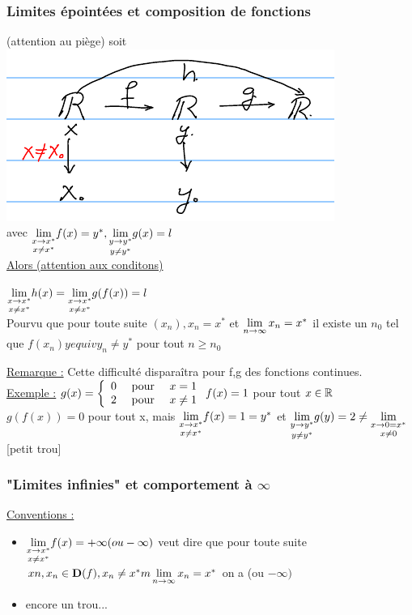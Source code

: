 \documentclass[12pt,a4paper]{article}
\begin{document}
{\subsubsection{Limites épointées et composition de fonctions}
(attention au piège)
soit \includegraphics[scale=0.5]{illustrations_Analyse/compo}\\
avec $\underset{x \neq x^*}{\lim\limits_{x \to x^*}} f(x )= y^*, \underset{y \neq y^*}{\lim\limits_{y \to y^*}} g(x) = l$\\
\underline{Alors (attention aux conditons)}
\begin{boite}
$\underset{x \neq x^*}{\lim\limits_{x \to x^*}} h(x) = \underset{x \neq x^*}{\lim\limits_{x \to x^*}} g(f(x)) = l$\\
Pourvu que pour toute suite $(x_n), x_n = x^*$ et $\lim\limits_{n \to \infty} x_n = x^*$ il existe un $n_0$ tel que $f(x_n) yequiv y_n \neq y^*$ pour tout $n \geq n_0$
\end{boite}
\underline{Remarque :} Cette difficulté disparaîtra pour f,g des fonctions continues.\\
\underline{Exemple :} $g(x) =
\left\{
\begin{array}{lll}
0 & \mbox{ pour } & x = 1\\
2 & \mbox{ pour } & x \neq 1
\end{array}
\right.\\
f(x) = 1$ pour tout $x \in \mathbb{R}$\\
$g(f(x)) = 0$ pour tout x, mais $\underset{x \neq x^*}{\lim\limits_{x \to x^*}} f(x) = 1 = y^*$ et $\underset{y \neq y^*}{\lim\limits_{y \to y^*}} g(y) = 2 \neq \underset{x \neq 0}{\lim\limits_{x \to 0 = x^*}}$[petit trou]\\
\subsubsection{"Limites infinies" et comportement à $\infty$}
\underline{Conventions :}
\begin{itemize}
\item $\underset{x \neq x^*}{\lim\limits_{x \to x^*}} f(x) = +\infty (ou -\infty)$ veut dire que pour toute suite $xn, x_n \in \mathbf{D}(f), x_n \neq x^*m \lim\limits_{n \to \infty} x_n = x^*$ on a 
(ou $-\infty)$
\item {encore un trou...}
\end{itemize}
}
\end{document}
